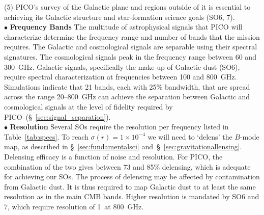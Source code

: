 \documentclass[PICOReport.tex]{subfiles}
\begin{document}
(5) PICO's survey of the Galactic plane and regions outside of it is essential to achieving its Galactic structure  and star-formation science goals (SO6, 7). \\
%
$\bullet$ {\bf Frequency Bands} \hspace{0.1in} The multitude of astrophysical signals that PICO will characterize determine the frequency range and number of bands that the mission requires. The Galactic and cosmological signals are separable using their spectral signatures. The cosmological signals peak in the frequency range between 60 and 300~GHz. Galactic signals, specifically the make-up of Galactic dust (SO6), require spectral characterization at frequencies between 100 and 800~GHz. Simulations indicate that 21 bands, each with 25\% bandwidth, that are spread across the range 20--800~GHz can achieve the separation between Galactic and cosmological signals at the level of fidelity required by PICO~(\S~\ref{sec:signal_separation}). \\
%
$\bullet$ {\bf Resolution} \hspace{0.1in} 
Several \ac{SOs} require the resolution per frequency listed in Table~\ref{tab:specs}. To reach $\sigma(r) = 1\times10^{-4}$ we will need to `delens' the $B$-mode map, as described in \S~\ref{sec:fundamentalsci} and~\S~\ref{sec:gravitationallensing}. Delensing efficacy is a function of noise and resolution. For PICO, the combination of the two gives between 73 and 85\% delensing, which is adequate for achieving our \ac{SOs}. The process of delensing may be affected by contamination from Galactic dust. It is thus required to map Galactic dust to at least the same resolution as in the main CMB bands.  Higher resolution is mandated by SO6 and 7, which require resolution of 1\arcmin\ at 800~GHz. 
\end{document}
